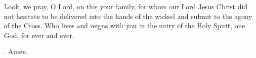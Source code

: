 \lettrine[lines=3]{L}{}ook, we pray, O Lord, on this your family,
for whom our Lord Jesus Christ
did not hesitate to be delivered into the hands of the wicked
and submit to the agony of the Cross.
Who lives and reigns with you
in the unity of the Holy Spirit,
one God, for ever and ever. \par \Rbar. Amen.
